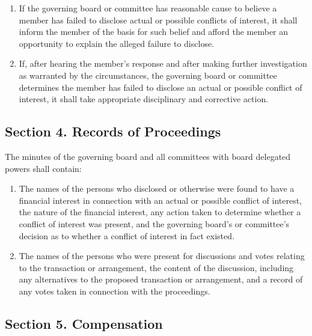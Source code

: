 \documentclass[a4paper]{article}
\begin{document}
\begin{enumerate}
\begin{enumerate}
\item If the governing board or committee has reasonable cause to believe a member has failed to disclose actual or possible conflicts of interest, it shall inform the member of the basis for such belief and afford the member an opportunity to explain the alleged failure to disclose.
\item If, after hearing the member's response and after making further investigation as warranted by the circumstances, the governing board or committee determines the member has failed to disclose an actual or possible conflict of interest, it shall take appropriate disciplinary and corrective action.
\end{enumerate}
\end{enumerate}


\subsection*{Section 4. Records of Proceedings}

The minutes of the governing board and all committees with board delegated powers shall contain:

\begin{enumerate}
\item The names of the persons who disclosed or otherwise were found to have a financial interest in connection with an actual or possible conflict of interest, the nature of the financial interest, any action taken to determine whether a conflict of interest was present, and the governing board's or committee's decision as to whether a conflict of interest in fact existed.
\item The names of the persons who were present for discussions and votes relating to the transaction or arrangement, the content of the discussion, including any alternatives to the proposed transaction or arrangement, and a record of any votes taken in connection with the proceedings.
\end{enumerate}

\subsection*{Section 5. Compensation}
\end{document}
